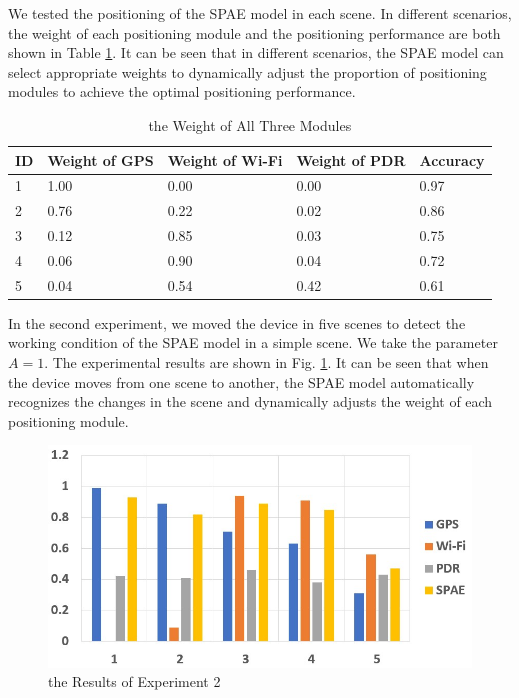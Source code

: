 \documentclass[conference]{IEEEtran}
\begin{document}
We tested the positioning of the SPAE model in each scene. In different scenarios, the weight of each positioning module and the positioning performance are both shown in Table \ref{tab:exp1}. It can be seen that in different scenarios, the SPAE model can select appropriate weights to dynamically adjust the proportion of positioning modules to achieve the optimal positioning performance.

\begin{table}[h]
	\centering
	\caption{the Weight of All Three Modules}
	\label{tab:exp1}
	\begin{tabular}{lllll}
		\hline
		ID & Weight of GPS & Weight of Wi-Fi & Weight of PDR & Accuracy \\ \hline
		1  & 1.00          & 0.00            & 0.00          & 0.97     \\
		2  & 0.76          & 0.22            & 0.02          & 0.86     \\
		3  & 0.12          & 0.85            & 0.03          & 0.75     \\
		4  & 0.06          & 0.90            & 0.04          & 0.72     \\
		5  & 0.04          & 0.54            & 0.42          & 0.61     \\ \hline             
	\end{tabular}
\end{table}

In the second experiment, we moved the device in five scenes to detect the working condition of the SPAE model in a simple scene. We take the parameter $A=1$. The experimental results are shown in Fig. \ref{fig:e2}. It can be seen that when the device moves from one scene to another, the SPAE model automatically recognizes the changes in the scene and dynamically adjusts the weight of each positioning module.

\begin{figure}[h]
	\centering
	\includegraphics[scale=0.5]{./figures/e2.jpg}
	\caption{the Results of Experiment 2}
	\label{fig:e2}
\end{figure}
\end{document}
